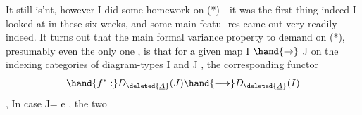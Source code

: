 It still is'nt, however I did some homework on (*) - it was the
first thing indeed I looked at in these six weeks, and some main featu-%
res came out very readily indeed. It turns out that the main formal
variance property to demand on (*), presumably even the only one , is
that for a given map  I $\hand{\to}$ J on the indexing categories of diagram-types
I and J , the corresponding functor
\[ \hand{f^*:} D_{\deleted{\underline{A}}}(J) \hand{\longrightarrow} D_{\deleted{\underline{A}}}(I) \]
\hand{\uline{\textcolor{black}{should have both a left and a right adjoint}}},  In case J= e , the two
